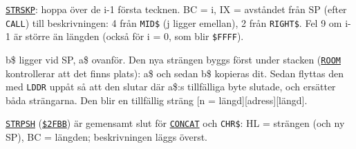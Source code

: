 \begin{Listing}
\Gap
\begin{Cmt}\par\noindent \hyperlink{l:STRSKP}{\texttt{STRSKP}}: hoppa över de i\mbox{-}1 första tecknen. BC = i, IX = avståndet från SP (efter \texttt{CALL}) till beskrivningen: 4 från \texttt{MID\$} (j ligger emellan), 2 från \texttt{RIGHT\$}. Fel 9 om i\mbox{-}1 är större än längden (också för i = 0, som blir \texttt{\$FFFF}).\par\end{Cmt}
\Gap
{}
\begin{Note}\par\noindent b\$ ligger vid SP, a\$ ovanför. Den nya strängen byggs först under stacken (\hyperlink{l:ROOM}{\texttt{ROOM}} kontrollerar att det finns plats): a\$ och sedan b\$ kopieras dit. Sedan flyttas den med \texttt{LDDR} uppåt så att den slutar där a\$:s tillfälliga byte slutade, och ersätter båda strängarna. Den blir en tillfällig sträng [n = längd][adress][längd].\par
\par\noindent \hyperlink{l:STRPSH}{\texttt{STRPSH}} (\hyperlink{a:2FBB}{\texttt{\$2FBB}}) är gemensamt slut för \hyperlink{l:CONCAT}{\texttt{CONCAT}} och \texttt{CHR\$}: HL = strängen (och ny SP), BC = längden; beskrivningen läggs överst.\par\end{Note}

\end{Listing}

